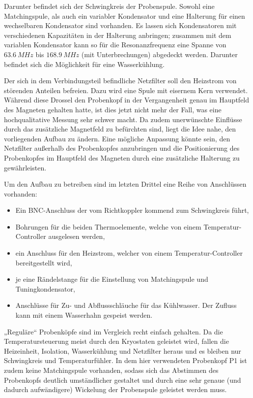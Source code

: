 Darunter befindet sich der Schwingkreis der Probenspule. Sowohl eine Matchingspule, als auch ein variabler Kondensator und eine Halterung für einen wechselbaren Kondensator sind vorhanden. Es lassen sich Kondensatoren mit verschiedenen Kapazitäten in der Halterung anbringen; zusammen mit dem variablen Kondensator kann so für die Resonanzfrequenz eine Spanne von $\SI{63,6}{MHz}$ bis $\SI{168,9}{MHz}$ (mit Unterbrechungen) abgedeckt werden. Darunter befindet sich die Möglichkeit für eine Wasserkühlung.

Der sich in dem Verbindungsteil befindliche Netzfilter soll den Heizstrom von störenden Anteilen befreien. Dazu wird eine Spule mit eisernem Kern verwendet. Während diese Drossel den Probenkopf in der Vergangenheit genau im Hauptfeld des Magneten gehalten hatte, ist dies jetzt nicht mehr der Fall, was eine hochqualitative Messung sehr schwer macht. Da zudem unerwünschte Einflüsse durch das zusätzliche Magnetfeld zu befürchten sind, liegt die Idee nahe, den vorliegenden Aufbau zu ändern. Eine mögliche Anpassung könnte sein, den Netzfilter außerhalb des Probenkopfes anzubringen und die Positionierung des Probenkopfes im Hauptfeld des Magneten durch eine zusätzliche Halterung zu gewährleisten.

Um den Aufbau zu betreiben sind im letzten Drittel eine Reihe von Anschlüssen vorhanden:
\begin{itemize}
	\item Ein BNC-Anschluss der vom Richtkoppler kommend zum Schwingkreis führt,
	\item Bohrungen für die beiden Thermoelemente, welche von einem Temperatur-Controller ausgelesen werden,
	\item ein Anschluss für den Heizstrom, welcher von einem Temperatur-Controller bereitgestellt wird,
	\item je eine Rändelstange für die Einstellung von Matching\-spu\-le und Tuningkondensator,
	\item Anschlüsse für Zu- und Abflussschläuche für das Kühlwasser. Der Zufluss kann mit einem Wasserhahn gespeist werden.
\end{itemize}

„Reguläre“ Probenköpfe sind im Vergleich recht einfach gehalten. Da die Temperatursteuerung meist durch den Kryostaten geleistet wird, fallen die Heizeinheit, Isolation, Wasserkühlung und Netzfilter heraus und es bleiben nur Schwingkreis und Temperaturfühler. In dem hier verwendeten Probenkopf P1 ist zudem keine Matchingspule vorhanden, sodass sich das Abstimmen des Probenkopfs deutlich umständlicher gestaltet und durch eine sehr genaue (und dadurch aufwändigere) Wickelung der Probenspule geleistet werden muss.




